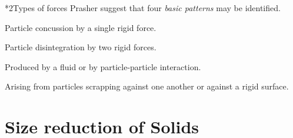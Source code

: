 \documentclass["OSF-Notebook.tex"]{subfiles}
\begin{document}
\begin{sectionBox}*2{Types of forces} %
  Prasher suggest that four \emph{basic patterns} may be identified. 
  \begin{description}[
    leftmargin=!,
    labelwidth=\widthof{} %
    ]
    \item[Impact:] Particle concussion by a single rigid force.
    \item[Compression:] Particle disintegration by two rigid forces.
    \item[Shear:]  Produced by a fluid or by particle-particle interaction.
    \item[Attrition:] Arising from particles scrapping against one another or against a rigid surface.
  \end{description}
\end{sectionBox}

\section{Size reduction of Solids} %
\setcounter{subsection}{2}
\end{document}
